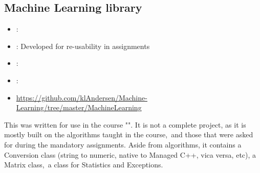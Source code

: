 \subsection{Machine Learning library}
\label{sec:ml_library}
\begin{itemize} 
	\item {}: 
	\item {}: Developed for re-usability in assignments
	\item {}: 
	\item {}: 
	\item {} \url{https://github.com/klAndersen/Machine-Learning/tree/master/MachineLearning}
\end{itemize} 
This was written for use in the course "". 
It is not a complete project, as it is mostly built on the algorithms taught in the course, and those that were asked for during the mandatory assignments. 
Aside from algorithms, it contains a Conversion class (string to numeric, native to Managed C++, vica versa, etc), a Matrix class, a class for Statistics and Exceptions.


